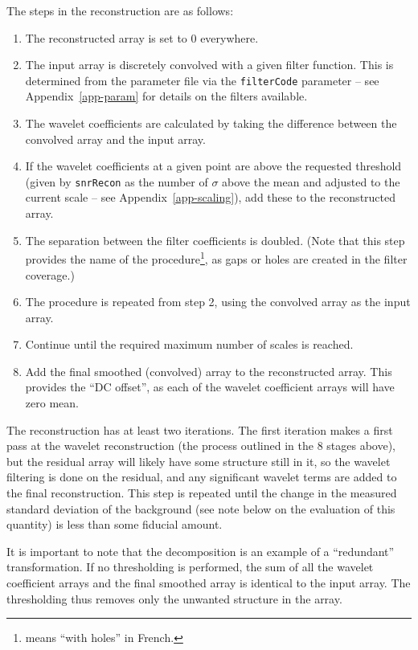 The steps in the \atrous reconstruction are as follows:
\begin{enumerate}
\item The reconstructed array is set to 0 everywhere.
\item The input array is discretely convolved with a given filter
  function. This is determined from the parameter file via the
  \texttt{filterCode} parameter -- see Appendix~\ref{app-param} for
  details on the filters available.
\item The wavelet coefficients are calculated by taking the difference
  between the convolved array and the input array.
\item If the wavelet coefficients at a given point are above the
  requested threshold (given by \texttt{snrRecon} as the number of
  $\sigma$ above the mean and adjusted to the current scale -- see
  Appendix~\ref{app-scaling}), add these to the reconstructed array.
\item The separation between the filter coefficients is doubled. (Note
  that this step provides the name of the procedure\footnote{\atrous
  means ``with holes'' in French.}, as gaps or holes are created in
  the filter coverage.)
\item The procedure is repeated from step 2, using the convolved array
  as the input array.
\item Continue until the required maximum number of scales is reached.
\item Add the final smoothed (\ie convolved) array to the
  reconstructed array. This provides the ``DC offset'', as each of the
  wavelet coefficient arrays will have zero mean.
\end{enumerate}

The reconstruction has at least two iterations. The first iteration
makes a first pass at the wavelet reconstruction (the process outlined
in the 8 stages above), but the residual array will likely have some
structure still in it, so the wavelet filtering is done on the
residual, and any significant wavelet terms are added to the final
reconstruction. This step is repeated until the change in the measured
standard deviation of the background (see note below on the evaluation
of this quantity) is less than some fiducial amount.

It is important to note that the \atrous decomposition is an example
of a ``redundant'' transformation. If no thresholding is performed,
the sum of all the wavelet coefficient arrays and the final smoothed
array is identical to the input array. The thresholding thus removes
only the unwanted structure in the array.

